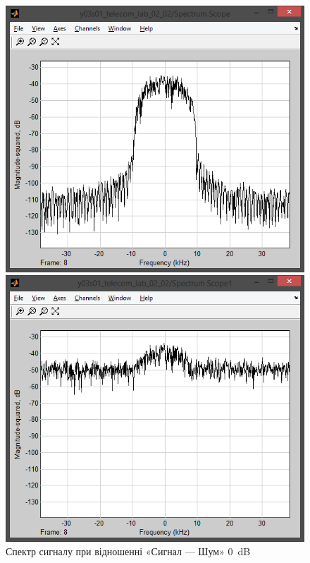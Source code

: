 \documentclass[
	a4paper,
	oneside,
	BCOR = 10mm,
	DIV = 12,
	12pt,
	headings = normal,
]{scrartcl}
\begin{document}
				\begin{figure}[!htbp]
					\begin{minipage}[t]{0.5\textwidth - 0.5em}
						\centering
						\includegraphics[height = 8\baselineskip]{../01-solution/00-SNR-100db-noshift-modulator-spectrum.png}
						\caption{Спектр сигналу при відношенні «Сигнал — Шум» \SI{100}{\deci\bel}}
						\label{fig:rolloff-0p0-spectrum-scope}
					\end{minipage}\hspace{1em}%
					\begin{minipage}[t]{0.5\textwidth - 0.5em}
						\centering
						\includegraphics[height = 8\baselineskip]{../01-solution/01-SNR-00-db-channel-spectrum.png}
						\caption{Спектр сигналу при відношенні «Сигнал — Шум» \SI{0}{\deci\bel}}
						\label{fig:rolloff-0p0-scope}
					\end{minipage}%
				\end{figure}
\end{document}
